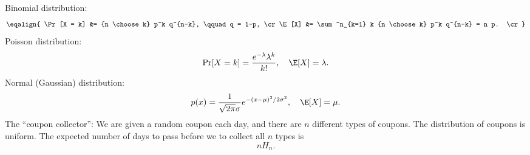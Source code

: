 Binomial distribution:
$$
\eqalign{
\Pr[X = k] &= {n \choose k} p^k q^{n-k}, \qquad q = 1-p, \cr
\E[X] &= \sum^n_{k=1} k {n \choose k} p^k q^{n-k} = n p. \cr
}
$$
Poisson distribution:
$$
\Pr[X = k] = {e^{-\lambda} \lambda^k \over k!}, \quad  \E[X] = \lambda.
$$
Normal (Gaussian) distribution:
$$
p(x) = {1 \over \sqrt{2 \pi} \sigma} e^{-(x-\mu)^2/2\sigma^2}, \quad \E[X] = \mu.
$$
The ``coupon collector'':
We are given a random coupon each day,
and there are $n$ different types of coupons.
The distribution of coupons is uniform.
The expected number of days to pass before we to collect all $n$ types is
$$n H_n.$$
